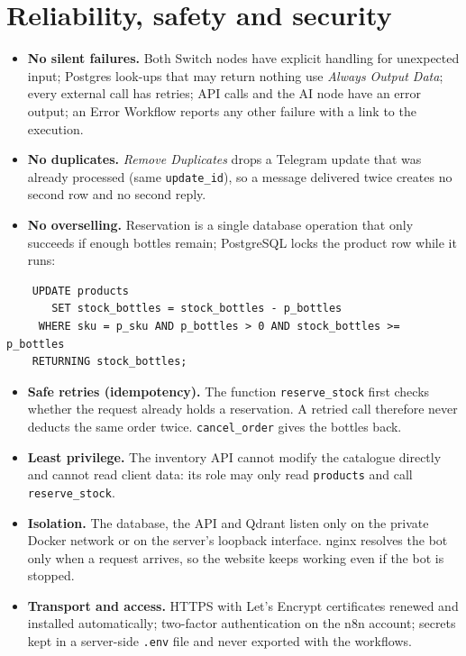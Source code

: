 \documentclass[11pt,a4paper]{article}
\newcommand{\nd}[1]{\emph{#1}}             %
\newcommand{\st}[1]{\texttt{#1}}           %
\begin{document}
\begin{minipage}{\linewidth}
\begin{minipage}{\linewidth}
\section{Reliability, safety and security}
\begin{itemize}
  \item \textbf{No silent failures.} Both Switch nodes have explicit handling for unexpected
        input; Postgres look-ups that may return nothing use \emph{Always Output Data}; every
        external call has retries; API calls and the AI node have an error output; an Error
        Workflow reports any other failure with a link to the execution.
  \item \textbf{No duplicates.} \nd{Remove Duplicates} drops a Telegram update that was already
        processed (same \st{update\_id}), so a message delivered twice creates no second row and
        no second reply.
  \item \textbf{No overselling.} Reservation is a single database operation that only succeeds if
        enough bottles remain; PostgreSQL locks the product row while it runs:
\end{itemize}
\begin{minipage}{\linewidth}
\small
\begin{verbatim}
    UPDATE products
       SET stock_bottles = stock_bottles - p_bottles
     WHERE sku = p_sku AND p_bottles > 0 AND stock_bottles >= p_bottles
    RETURNING stock_bottles;
\end{verbatim}
\end{minipage}
\begin{itemize}
  \item \textbf{Safe retries (idempotency).} The function \st{reserve\_stock} first checks whether
        the request already holds a reservation. A retried call therefore never deducts the same
        order twice. \st{cancel\_order} gives the bottles back.
  \item \textbf{Least privilege.} The inventory API cannot modify the catalogue directly and
        cannot read client data: its role may only read \st{products} and call
        \st{reserve\_stock}.
  \item \textbf{Isolation.} The database, the API and Qdrant listen only on the private Docker
        network or on the server's loopback interface. nginx resolves the bot only when a request
        arrives, so the website keeps working even if the bot is stopped.
  \item \textbf{Transport and access.} HTTPS with Let's Encrypt certificates renewed and installed
        automatically; two-factor authentication on the n8n account; secrets kept in a
        server-side \st{.env} file and never exported with the workflows.
\end{itemize}


\end{minipage}
\end{minipage}
\end{document}
